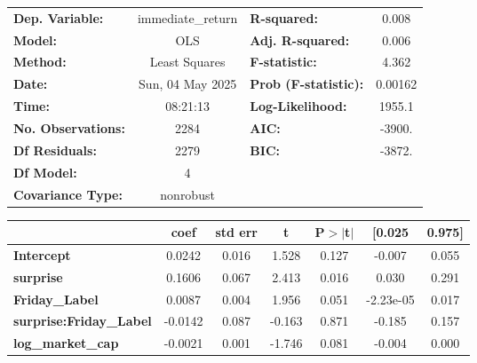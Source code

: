 \begin{center}
\begin{tabular}{lclc}
\toprule
\textbf{Dep. Variable:}         & immediate\_return & \textbf{  R-squared:         } &     0.008   \\
\textbf{Model:}                 &        OLS        & \textbf{  Adj. R-squared:    } &     0.006   \\
\textbf{Method:}                &   Least Squares   & \textbf{  F-statistic:       } &     4.362   \\
\textbf{Date:}                  &  Sun, 04 May 2025 & \textbf{  Prob (F-statistic):} &  0.00162    \\
\textbf{Time:}                  &      08:21:13     & \textbf{  Log-Likelihood:    } &    1955.1   \\
\textbf{No. Observations:}      &         2284      & \textbf{  AIC:               } &    -3900.   \\
\textbf{Df Residuals:}          &         2279      & \textbf{  BIC:               } &    -3872.   \\
\textbf{Df Model:}              &            4      & \textbf{                     } &             \\
\textbf{Covariance Type:}       &     nonrobust     & \textbf{                     } &             \\
\bottomrule
\end{tabular}
\begin{tabular}{lcccccc}
                                & \textbf{coef} & \textbf{std err} & \textbf{t} & \textbf{P$> |$t$|$} & \textbf{[0.025} & \textbf{0.975]}  \\
\midrule
\textbf{Intercept}              &       0.0242  &        0.016     &     1.528  &         0.127        &       -0.007    &        0.055     \\
\textbf{surprise}               &       0.1606  &        0.067     &     2.413  &         0.016        &        0.030    &        0.291     \\
\textbf{Friday\_Label}          &       0.0087  &        0.004     &     1.956  &         0.051        &    -2.23e-05    &        0.017     \\
\textbf{surprise:Friday\_Label} &      -0.0142  &        0.087     &    -0.163  &         0.871        &       -0.185    &        0.157     \\
\textbf{log\_market\_cap}       &      -0.0021  &        0.001     &    -1.746  &         0.081        &       -0.004    &        0.000     \\

\end{tabular}
\end{center}
